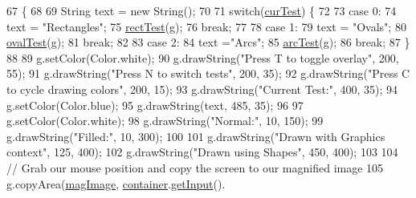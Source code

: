 \begin{DoxyCode}
67                                                             \{
68         
69         String text = \textcolor{keyword}{new} String();
70         
71         \textcolor{keywordflow}{switch}(\mbox{\hyperlink{classorg_1_1newdawn_1_1slick_1_1tests_1_1_geom_accuracy_test_af77c3724514db2ec92fcaddf834ca506}{curTest}}) \{
72         
73         \textcolor{keywordflow}{case} 0:
74                 text = \textcolor{stringliteral}{"Rectangles"};
75                 \mbox{\hyperlink{classorg_1_1newdawn_1_1slick_1_1tests_1_1_geom_accuracy_test_a4e834ec4ced988049195453501f4f994}{rectTest}}(g);
76                 \textcolor{keywordflow}{break};
77                 
78         \textcolor{keywordflow}{case} 1:
79                 text = \textcolor{stringliteral}{"Ovals"};
80                 \mbox{\hyperlink{classorg_1_1newdawn_1_1slick_1_1tests_1_1_geom_accuracy_test_abd5a4ec899e7ccd77fc50de593b42fbf}{ovalTest}}(g);
81                 \textcolor{keywordflow}{break};
82                 
83         \textcolor{keywordflow}{case} 2:
84                 text =\textcolor{stringliteral}{"Arcs"};
85                 \mbox{\hyperlink{classorg_1_1newdawn_1_1slick_1_1tests_1_1_geom_accuracy_test_ada59c50af8421f5dc9c146ed5c562dfb}{arcTest}}(g);
86                 \textcolor{keywordflow}{break};
87         \}
88         
89         g.setColor(Color.white);
90         g.drawString(\textcolor{stringliteral}{"Press T to toggle overlay"}, 200, 55);
91         g.drawString(\textcolor{stringliteral}{"Press N to switch tests"}, 200, 35);
92         g.drawString(\textcolor{stringliteral}{"Press C to cycle drawing colors"}, 200, 15);
93         g.drawString(\textcolor{stringliteral}{"Current Test:"}, 400, 35);
94         g.setColor(Color.blue);
95         g.drawString(text, 485, 35);
96         
97         g.setColor(Color.white);
98         g.drawString(\textcolor{stringliteral}{"Normal:"}, 10, 150);
99         g.drawString(\textcolor{stringliteral}{"Filled:"}, 10, 300);
100         
101         g.drawString(\textcolor{stringliteral}{"Drawn with Graphics context"}, 125, 400);
102         g.drawString(\textcolor{stringliteral}{"Drawn using Shapes"}, 450, 400);
103         
104         \textcolor{comment}{// Grab our mouse position and copy the screen to our magnified image}
105         g.copyArea(\mbox{\hyperlink{classorg_1_1newdawn_1_1slick_1_1tests_1_1_geom_accuracy_test_a29113b87453f7bebdf3ced47b8055164}{magImage}}, \mbox{\hyperlink{classorg_1_1newdawn_1_1slick_1_1tests_1_1_geom_accuracy_test_aa36ef5e207393c1e48bdc579da524cf0}{container}}.\mbox{\hyperlink{classorg_1_1newdawn_1_1slick_1_1_game_container_a6042fd06c54872f9f791bd33beffec88}{getInput}}().

\end{DoxyCode}
